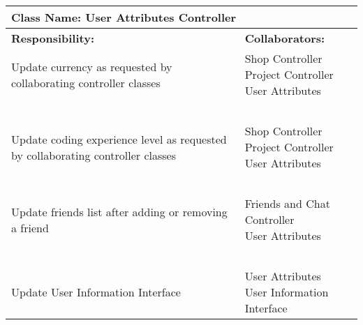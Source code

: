 \documentclass[]{article}
\begin{document}
\begin{table}[H]
    \centering
    \begin{tabular}{|p{5cm}|p{5cm}|}
        \hline
        \multicolumn{2}{|l|}{\textbf{Class Name:} User Attributes Controller}\\
        \hline
        \textbf{Responsibility:} & \textbf{Collaborators:}\\
        \hline
        Update currency as requested by collaborating controller classes & \makecell[l]{Shop Controller\\Project Controller\\User Attributes}\\
        ~ & ~\\
        Update coding experience level as requested by collaborating controller classes & \makecell[l]{Shop Controller\\Project Controller\\User Attributes}\\
        ~ & ~\\
        Update friends list after adding or removing a friend & \makecell[l]{Friends and Chat Controller\\User Attributes}\\
        ~ & ~\\
        Update User Information Interface & \makecell[l]{User Attributes\\User Information Interface}\\
        \hline
    \end{tabular}
\end{table}
\end{document}
